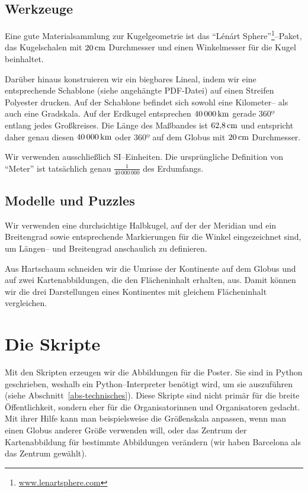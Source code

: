 \documentclass[a4paper,12pt]{article}
\begin{document}
\subsection{Werkzeuge}

Eine gute Materialsammlung zur Kugelgeometrie ist das 
"`Lénárt Sphere"'\footnote{\url{www.lenartsphere.com}}--Paket, das Kugelschalen mit 
$20\,{\rm cm}$ Durchmesser und einen Winkelmesser für die Kugel beinhaltet. 

Darüber hinaus konstruieren wir ein biegbares Lineal, indem wir eine entsprechende 
Schablone (siehe angehängte PDF-Datei) auf einen Streifen Polyester drucken. Auf der 
Schablone befindet sich sowohl eine Kilometer-- als auch eine Gradskala. 
Auf der Erdkugel entsprechen $40\,000\,{\rm km}$ gerade $360º$ entlang
jedes Großkreises. Die Länge des Maßbandes ist $62{,}8\,{\rm cm}$ und entspricht daher
genau diesen $40\,000\,{\rm km}$ oder $360º$ auf dem Globus mit $20\,{\rm cm}$ 
Durchmesser.

Wir verwenden ausschließlich SI--Einheiten. Die ursprüngliche Definition von "`Meter"'
ist tatsächlich genau $\frac{1}{40\,000\,000}$ des Erdumfangs.


\subsection{Modelle und Puzzles}

Wir verwenden eine durchsichtige Halbkugel, auf der der Meridian und ein Breitengrad
sowie entsprechende Markierungen für die Winkel eingezeichnet sind, um Längen-- und
Breitengrad anschaulich zu definieren.

Aus Hartschaum schneiden wir die Umrisse der Kontinente auf dem Globus und auf zwei
Kartenabbildungen, die den Flächeninhalt erhalten, aus. Damit können wir die drei 
Darstellungen eines Kontinentes mit gleichem Flächeninhalt vergleichen.


\section{Die Skripte}

Mit den Skripten erzeugen wir die Abbildungen für die Poster. Sie sind in Python 
geschrieben, weshalb ein Python--Interpreter benötigt wird, um sie auszuführen
(siehe Abschnitt~\ref{abs-technisches}). Diese Skripte sind nicht primär für die
breite Öffentlichkeit, sondern eher für die Organisatorinnen und Organisatoren gedacht.
Mit ihrer Hilfe kann man beispielsweise die Größenskala anpassen, wenn man einen
Globus anderer Größe verwenden will, oder das Zentrum der Kartenabbildung für bestimmte
Abbildungen verändern (wir haben Barcelona als das Zentrum gewählt).
\end{document}
